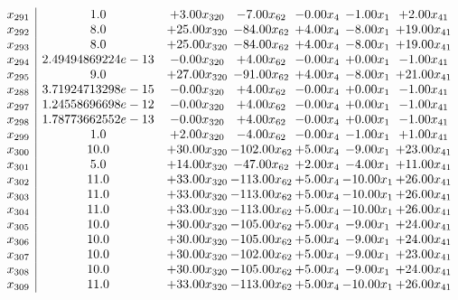 \documentclass[8pt]{article}
\begin{document}
\[\begin{array}{c| c c@{\hskip 2pt} c@{\hskip 2pt} c@{\hskip 2pt} c@{\hskip 2pt} c@{\hskip 2pt} }
 x_{291}   &  1.0 & +  3.00 x_{320} & -7.00 x_{62} & -0.00 x_{4} & -1.00 x_{1} & +  2.00 x_{41}\\
 x_{292}   &  8.0 & + 25.00 x_{320} & -84.00 x_{62} & +  4.00 x_{4} & -8.00 x_{1} & + 19.00 x_{41}\\
 x_{293}   &  8.0 & + 25.00 x_{320} & -84.00 x_{62} & +  4.00 x_{4} & -8.00 x_{1} & + 19.00 x_{41}\\
 x_{294}   &  2.49494869224e-13 & -0.00 x_{320} & +  4.00 x_{62} & -0.00 x_{4} & +  0.00 x_{1} & -1.00 x_{41}\\
 x_{295}   &  9.0 & + 27.00 x_{320} & -91.00 x_{62} & +  4.00 x_{4} & -8.00 x_{1} & + 21.00 x_{41}\\
 x_{288}   &  3.71924713298e-15 & -0.00 x_{320} & +  4.00 x_{62} & -0.00 x_{4} & +  0.00 x_{1} & -1.00 x_{41}\\
 x_{297}   &  1.24558696698e-12 & -0.00 x_{320} & +  4.00 x_{62} & -0.00 x_{4} & +  0.00 x_{1} & -1.00 x_{41}\\
 x_{298}   &  1.78773662552e-13 & -0.00 x_{320} & +  4.00 x_{62} & -0.00 x_{4} & +  0.00 x_{1} & -1.00 x_{41}\\
 x_{299}   &  1.0 & +  2.00 x_{320} & -4.00 x_{62} & -0.00 x_{4} & -1.00 x_{1} & +  1.00 x_{41}\\
 x_{300}   &  10.0 & + 30.00 x_{320} & -102.00 x_{62} & +  5.00 x_{4} & -9.00 x_{1} & + 23.00 x_{41}\\
 x_{301}   &  5.0 & + 14.00 x_{320} & -47.00 x_{62} & +  2.00 x_{4} & -4.00 x_{1} & + 11.00 x_{41}\\
 x_{302}   &  11.0 & + 33.00 x_{320} & -113.00 x_{62} & +  5.00 x_{4} & -10.00 x_{1} & + 26.00 x_{41}\\
 x_{303}   &  11.0 & + 33.00 x_{320} & -113.00 x_{62} & +  5.00 x_{4} & -10.00 x_{1} & + 26.00 x_{41}\\
 x_{304}   &  11.0 & + 33.00 x_{320} & -113.00 x_{62} & +  5.00 x_{4} & -10.00 x_{1} & + 26.00 x_{41}\\
 x_{305}   &  10.0 & + 30.00 x_{320} & -105.00 x_{62} & +  5.00 x_{4} & -9.00 x_{1} & + 24.00 x_{41}\\
 x_{306}   &  10.0 & + 30.00 x_{320} & -105.00 x_{62} & +  5.00 x_{4} & -9.00 x_{1} & + 24.00 x_{41}\\
 x_{307}   &  10.0 & + 30.00 x_{320} & -102.00 x_{62} & +  5.00 x_{4} & -9.00 x_{1} & + 23.00 x_{41}\\
 x_{308}   &  10.0 & + 30.00 x_{320} & -105.00 x_{62} & +  5.00 x_{4} & -9.00 x_{1} & + 24.00 x_{41}\\
 x_{309}   &  11.0 & + 33.00 x_{320} & -113.00 x_{62} & +  5.00 x_{4} & -10.00 x_{1} & + 26.00 x_{41}\\

\end{array}\]
\end{document}
